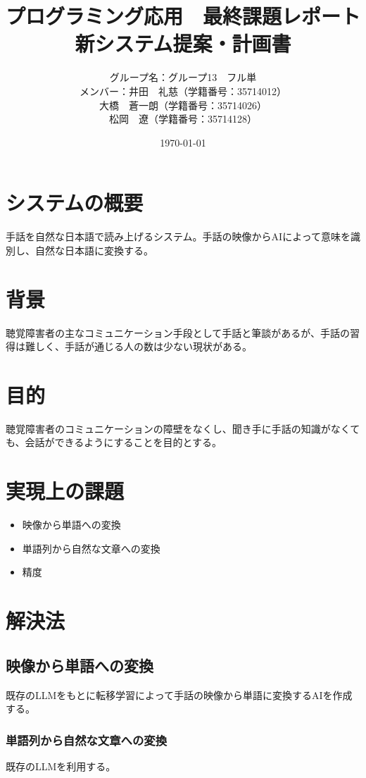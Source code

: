\documentclass[12pt,a4paper]{jsarticle}
\title{プログラミング応用　最終課題レポート\\
\large 新システム提案・計画書}
\author{
グループ名：グループ13　フル単\\
メンバー：井田　礼慈（学籍番号：35714012）\\
\quad\quad\quad 大橋　蒼一朗（学籍番号：35714026）\\
\quad\quad\quad 松岡　遼（学籍番号：35714128）\\
}
\date{\today}
\begin{document}
\maketitle

\newpage

\section{システムの概要}
手話を自然な日本語で読み上げるシステム。手話の映像からAIによって意味を識別し、自然な日本語に変換する。
\section{背景}

聴覚障害者の主なコミュニケーション手段として手話と筆談があるが、手話の習得は難しく、手話が通じる人の数は少ない現状がある。


\section{目的}

聴覚障害者のコミュニケーションの障壁をなくし、聞き手に手話の知識がなくても、会話ができるようにすることを目的とする。

\section{実現上の課題}

\begin{itemize}
    \item 映像から単語への変換
    \item 単語列から自然な文章への変換
    \item 精度
\end{itemize}

\section{解決法}

\subsection{映像から単語への変換}
既存のLLMをもとに転移学習によって手話の映像から単語に変換するAIを作成する。
\subsubsection{単語列から自然な文章への変換}
既存のLLMを利用する。
\end{document}
